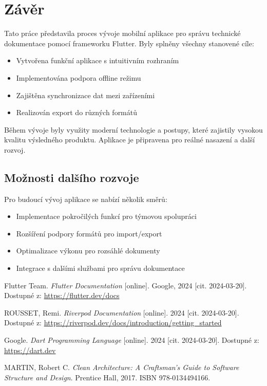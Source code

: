 \documentclass[12pt, a4paper,
twoside,        %
openright
]{report}
\begin{document}
\chapter{Závěr}
\label{chap:zaver}

Tato práce představila proces vývoje mobilní aplikace pro správu technické dokumentace pomocí frameworku Flutter. Byly splněny všechny stanovené cíle:

\begin{itemize}
    \item Vytvořena funkční aplikace s intuitivním rozhraním
    \item Implementována podpora offline režimu
    \item Zajištěna synchronizace dat mezi zařízeními
    \item Realizován export do různých formátů
\end{itemize}

Během vývoje byly využity moderní technologie a postupy, které zajistily vysokou kvalitu výsledného produktu. Aplikace je připravena pro reálné nasazení a další rozvoj.

\section{Možnosti dalšího rozvoje}
Pro budoucí vývoj aplikace se nabízí několik směrů:
\begin{itemize}
    \item Implementace pokročilých funkcí pro týmovou spolupráci
    \item Rozšíření podpory formátů pro import/export
    \item Optimalizace výkonu pro rozsáhlé dokumenty
    \item Integrace s dalšími službami pro správu dokumentace
\end{itemize}

\begin{thebibliography}{99}
 Flutter Team. \textit{Flutter Documentation} [online]. Google, 2024 [cit. 2024-03-20]. Dostupné z: \url{https://flutter.dev/docs}

 ROUSSET, Remi. \textit{Riverpod Documentation} [online]. 2024 [cit. 2024-03-20]. Dostupné z: \url{https://riverpod.dev/docs/introduction/getting_started}

 Google. \textit{Dart Programming Language} [online]. 2024 [cit. 2024-03-20]. Dostupné z: \url{https://dart.dev}

 MARTIN, Robert C. \textit{Clean Architecture: A Craftsman's Guide to Software Structure and Design}. Prentice Hall, 2017. ISBN 978-0134494166.
\end{thebibliography}

\listoffigures

\listoftables
\end{document}
